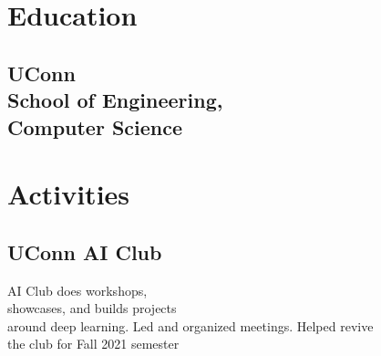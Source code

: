 \documentclass[]{resume-template}
\begin{document}
%
%
\lastupdated{}

%
%

%
%

\begin{minipage}[t]{0.33\textwidth} 


\section{Education}


\subsection{UConn\\ School of Engineering,\\ Computer Science}\label{subsec:uconn-school-of-engineering}

\sectionsep{}




\section{Activities}\label{sec:activities}
\subsection{UConn AI Club}\label{subsec:uconn-ai-club}
AI Club does workshops,\\showcases, and builds projects\\ around deep learning.
Led and organized meetings.
Helped revive \\the club for Fall 2021 semester
\vspace{\topsep}


\end{minipage}
\end{document}
